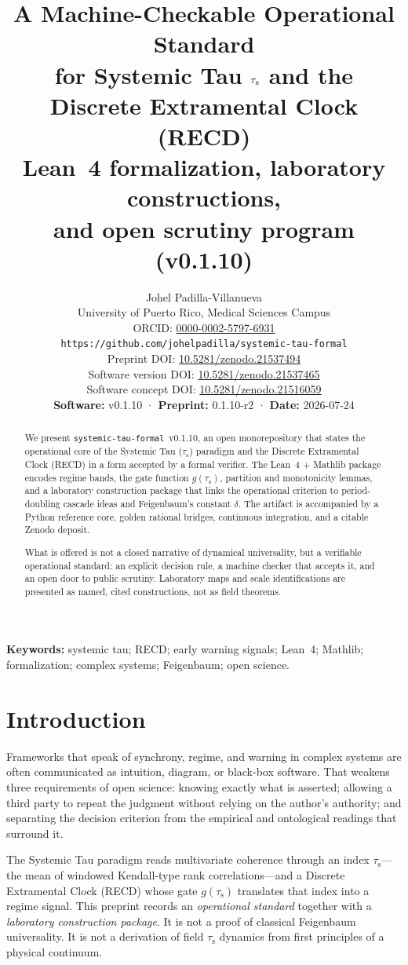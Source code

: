 \documentclass[11pt,a4paper]{article}
\title{%
  A Machine-Checkable Operational Standard\\
  for Systemic Tau \(\taus\) and the Discrete Extramental Clock (RECD)\\[0.6em]
  \large Lean~4 formalization, laboratory constructions,\\
  and open scrutiny program (v0.1.10)%
}
\author{%
  Johel Padilla-Villanueva\\
  \small University of Puerto Rico, Medical Sciences Campus\\
  \small ORCID: \href{https://orcid.org/0000-0002-5797-6931}{0000-0002-5797-6931}\\
  \small \texttt{https://github.com/johelpadilla/systemic-tau-formal}\\
  \small Preprint DOI: \href{https://doi.org/10.5281/zenodo.21537494}{10.5281/zenodo.21537494}\\
  \small Software version DOI: \href{https://doi.org/10.5281/zenodo.21537465}{10.5281/zenodo.21537465}\\
  \small Software concept DOI: \href{https://doi.org/10.5281/zenodo.21516059}{10.5281/zenodo.21516059}\\[0.4em]
  \small \textbf{Software:} v0.1.10
  \quad·\quad
  \textbf{Preprint:} 0.1.10-r2
  \quad·\quad
  \textbf{Date:} 2026-07-24
}
\date{}
\newcommand{\taus}{\tau_{\mathrm{s}}}
\begin{document}
\maketitle

\begin{abstract}
\noindent
We present \texttt{systemic-tau-formal}~v0.1.10, an open monorepository that states the operational core of the Systemic Tau (\(\taus\)) paradigm and the Discrete Extramental Clock (RECD) in a form accepted by a formal verifier. The Lean~4 + Mathlib package encodes regime bands, the gate function \(g(\taus)\), partition and monotonicity lemmas, and a laboratory construction package that links the operational criterion to period-doubling cascade ideas and Feigenbaum's constant \(\delta\). The artifact is accompanied by a Python reference core, golden rational bridges, continuous integration, and a citable Zenodo deposit.

What is offered is not a closed narrative of dynamical universality, but a verifiable operational standard: an explicit decision rule, a machine checker that accepts it, and an open door to public scrutiny. Laboratory maps and scale identifications are presented as named, cited constructions, not as field theorems.
\end{abstract}

\noindent\textbf{Keywords:} systemic tau; RECD; early warning signals; Lean~4; Mathlib; formalization; complex systems; Feigenbaum; open science.

\tableofcontents
\newpage

\section{Introduction}

Frameworks that speak of synchrony, regime, and warning in complex systems are often communicated as intuition, diagram, or black-box software. That weakens three requirements of open science: knowing exactly what is asserted; allowing a third party to repeat the judgment without relying on the author's authority; and separating the decision criterion from the empirical and ontological readings that surround it.

The Systemic Tau paradigm reads multivariate coherence through an index \(\taus\)---the mean of windowed Kendall-type rank correlations---and a Discrete Extramental Clock (RECD) whose gate \(g(\taus)\) translates that index into a regime signal. This preprint records an \emph{operational standard} together with a \emph{laboratory construction package}. It is not a proof of classical Feigenbaum universality. It is not a derivation of field \(\taus\) dynamics from first principles of a physical continuum.
\end{document}
